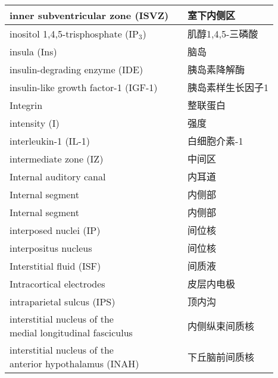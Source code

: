 \begin{longtable}{lll}
	\midrule
	inner subventricular zone (ISVZ)   && 室下内侧区  \\
	
	\midrule
	inositol 1,4,5-trisphosphate  (IP$_3$) && 肌醇1,4,5-三磷酸  \\
	
	\midrule
	insula (Ins)   && 脑岛  \\
	
	\midrule
	insulin-degrading enzyme (IDE)   && 胰岛素降解酶  \\
	
	\midrule
	insulin-like growth factor-1 (IGF-1)   && 胰岛素样生长因子1  \\
	
	\midrule
	Integrin  && 整联蛋白  \\
	
	\midrule
	intensity (I)  && 强度  \\
	
	\midrule
	interleukin-1 (IL-1) && 白细胞介素-1  \\
	
	\midrule
	intermediate zone (IZ)  && 中间区  \\
	
	\midrule
	Internal auditory canal   && 内耳道  \\
	
	\midrule
	Internal segment  && 内侧部  \\
	
	\midrule
	Internal segment  && 内侧部  \\
	
	\midrule
	interposed nuclei (IP)  && 间位核  \\
	
	\midrule
	interpositus nucleus  && 间位核  \\
	
	\midrule
	Interstitial fluid (ISF)  && 间质液  \\
	
	\midrule
	Intracortical electrodes   && 皮层内电极  \\
	
	\midrule
	intraparietal sulcus (IPS)   && 顶内沟  \\
	
	\midrule
	\makecell[l]{interstitial nucleus of the \\medial longitudinal fasciculus}   && 内侧纵束间质核  \\
	
	\midrule
	\makecell[l]{interstitial nucleus of the \\anterior hypothalamus  (INAH)} && 下丘脑前间质核  \\
	

\end{longtable}
